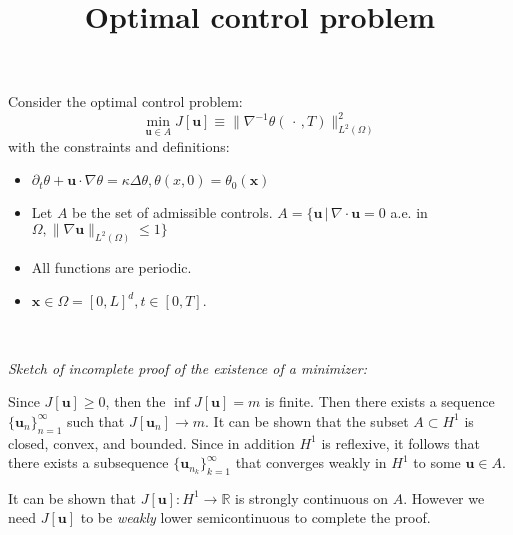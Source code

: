 \documentclass[11pt]{amsart}
\title{Optimal control problem}
\begin{document}
\maketitle

Consider the optimal control problem:
\begin{equation}
\min_{\mathbf{u}\in A} J[\mathbf{u}] \equiv \|\nabla^{-1}\theta( \,\cdot\, , T)\|^2_{L^{2}(\Omega)}
\end{equation}
with the constraints and definitions:
\begin{itemize}
\item $\partial_{t} \theta + \mathbf{u}\cdot \nabla \theta = \kappa \Delta \theta , \theta(x,0)=\theta_0(\mathbf{x})$
\item Let $A$ be the set of admissible controls. $A = \{ \mathbf{u} \, | \, \nabla \cdot \mathbf{u} = 0$ a.e. in $ \Omega, \|\nabla\mathbf{u}\|_{L^2(\Omega)}\leq 1 \}$
\item All functions are periodic.
\item $\mathbf{x}\in \Omega = [0,L]^d , t\in[0,T]$.
\end{itemize}

\

{\it Sketch of incomplete proof of the existence of a minimizer:}

Since $J[\mathbf{u}] \geq 0$, then the $\inf J[\mathbf{u}]=m$ is finite. Then there exists a sequence $\{\mathbf{u}_{n}\}_{n=1}^{\infty}$ such that $J[\mathbf{u}_{n}]\rightarrow m$.
It can be shown that the subset $A \subset H^{1}$ is closed, convex, and bounded. Since in addition $H^1$ is reflexive, it follows that there exists a subsequence  $\{\mathbf{u}_{n_k}\}_{k=1}^{\infty}$ that converges weakly in $H^{1}$ to some $\mathbf{u} \in A$. 

It can be shown that $J[\mathbf{u}]: H^1 \rightarrow \mathds{R}$  is strongly continuous on $A$. However we need $J[\mathbf{u}]$ to be {\it weakly} lower semicontinuous to complete the proof. 
\end{document}
